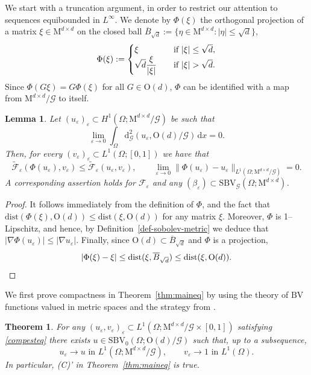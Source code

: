 \documentclass[a4paper,reqno]{amsart}
\newcommand{\BV}{\mathrm{BV}}
\newcommand{\SBV}{\mathrm{SBV}}
\newcommand{\SBVG}{\mathrm{SBV}_{\mathcal{G}}}
\newcommand{\dG}{\mathrm{d}_{\G}}
\newcommand\dist{{\mathrm{dist}}}
\newcommand\eps{{\varepsilon}}
\newtheorem{lemma}[definition]{Lemma}
\newtheorem{theorem}[definition]{Theorem}
\theoremstyle{remark}
\def\e{\varepsilon}
\newcommand{\EEE}{\color{black}}
\newcommand\dx{{\,\mathrm{d}x}}
\newcommand{\F}{\mathcal{F}}
\newcommand{\G}{\mathcal{G}}
\newcommand{\tF}{\widetilde{\F}}
\newcommand{\On}{\mathrm{O}(d)}
\newcommand{\Mno}{\mathrm{M}^{d\times d}}
\numberwithin{equation}{section}
\begin{document}
We start with a truncation argument, in order to restrict our attention to sequences equibounded in $L^\infty$. We denote by $\Phi(\xi)$ the orthogonal projection of a matrix $\xi\in\Mno$ on the closed ball  $\overline B_{\sqrt d}:=\{\eta\in\Mno\colon |\eta|\leq  \sqrt d\}$,
\begin{equation}\label{f:proj}
	\Phi(\xi):=\begin{cases}
		\xi\quad &\hbox{if } |\xi|\leq  \sqrt d,\\
		\displaystyle{\sqrt d \frac{\xi}{|\xi|}} \quad &\hbox{if } |\xi|> \sqrt d.
	\end{cases}
\end{equation}
Since $\Phi(G\xi)=G \Phi(\xi)$ for all $G \in \On$,
$\Phi$ can be identified with a map from $\Mno/\G$ to itself.

\begin{lemma}\label{l:linfty}
	Let $(u_\varepsilon)_\varepsilon \subset H^1(\Omega; \Mno/\G)$ be such that
	\begin{equation}\label{1104251323}
	\lim_{\e\to0}	\int_{{\Omega} } \dG^2(u_\varepsilon, \On/\G) \dx =0.
	\end{equation}
Then, for every 
	$(v_\varepsilon)_\varepsilon\subset L^1(\Omega; [0,1])$ we have that 
	\begin{equation}\label{F:trunk}
		\tF_{\e}({\Phi}(u_\e),v_\e)\leq \tF_{\e}(u_\e,v_\e), \qquad \lim_{\e \to 0} 	\|{\Phi}(u_\e)-u_\e\|_{L^1(\Omega; \Mno/\G)}=0.
	\end{equation}
A corresponding assertion holds for 
$\F_\e$ and 
any $(\beta_\eps)\subset \SBVG(\Omega;\Mno)$.
\end{lemma}

\begin{proof}
It follows immediately from the definition of $\Phi$, and the fact that
		$\dist(\Phi(\xi), \On)\leq \dist(\xi, \On)$ for any matrix $\xi$.
	 Moreover, $\Phi$ is 1--Lipschitz, and hence, by  Definition~\ref{def-sobolev-metric} we deduce that
	$|\nabla {\Phi}(u_\e)| \leq |\nabla u_\e|$.
	Finally, 
	since $\On\subset \overline B_{\sqrt d}$ and $\Phi$ is a projection,
	\[
	|{\Phi}(\xi)-\xi|
	\le \dist(\xi, \overline B_{\sqrt d})
	\le \dist(\xi, \On).\qedhere
	\]
\end{proof}
We first prove compactness  in Theorem~\ref{thm:maineq} \EEE by using the theory of $\BV$ functions valued in metric spaces and the strategy from \cite{ConFocIur25}.

\begin{theorem}\label{t:comp1}
	For any $(u_\varepsilon, v_\varepsilon)_\varepsilon \subset L^1(\Omega;\Mno/\G \times [0,1])$ satisfying \eqref{compesteq}
	there exists $u \in \SBV_0(\Omega; \On/\G)$ such that, up to a subsequence,
	\begin{equation*}
		u_\varepsilon \to u \text{ in }L^1(\Omega; \Mno/\G),\qquad v_\varepsilon \to 1 \text{ in }L^1(\Omega).
	\end{equation*}
	In particular, (C)' in Theorem~\ref{thm:maineq} is true.
\end{theorem}
\end{document}
